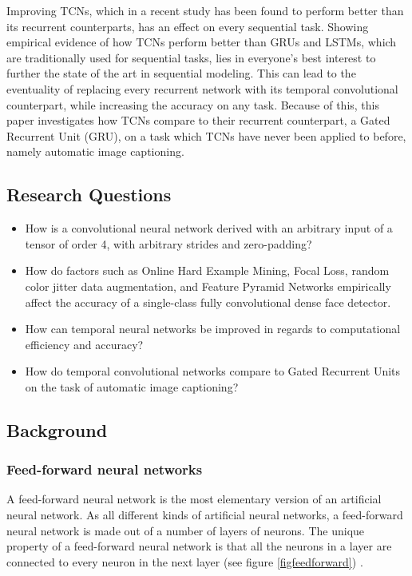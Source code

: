 \documentclass[a4paper, twoside]{article}
\begin{document}
Improving TCNs, which in a recent study \cite{tcn} has been found to perform better than its recurrent counterparts, has an effect on every sequential task. Showing empirical evidence of how TCNs perform better than GRUs and LSTMs, which are traditionally used for sequential tasks, lies in everyone's best interest to further the state of the art in sequential modeling. This can lead to the eventuality of replacing every recurrent network with its temporal convolutional counterpart, while increasing the accuracy on any task. Because of this, this paper investigates how TCNs compare to their recurrent counterpart, a Gated Recurrent Unit (GRU), on a task which TCNs have never been applied to before, namely automatic image captioning.

\subsection{Research Questions}

\begin{itemize}
\item How is a convolutional neural network derived with an arbitrary input of a tensor of order 4, with arbitrary strides and zero-padding?

\item How do factors such as Online Hard Example Mining, Focal Loss, random color jitter data augmentation, and Feature Pyramid Networks empirically affect the accuracy of a single-class fully convolutional dense face detector.

\item How can temporal neural networks be improved in regards to computational efficiency and accuracy?

\item How do temporal convolutional networks compare to Gated Recurrent Units on the task of automatic image captioning?

\end{itemize}

\subsection{Background}
\subsubsection{Feed-forward neural networks}
A feed-forward neural network is the most elementary version of an artificial neural network. As all different kinds of artificial neural networks, a feed-forward neural network is made out of a number of layers of neurons. The unique property of a feed-forward neural network is that all the neurons in a layer are connected to every neuron in the next layer (see figure \ref{figfeedforward}) \cite{cs231n}.
\end{document}
